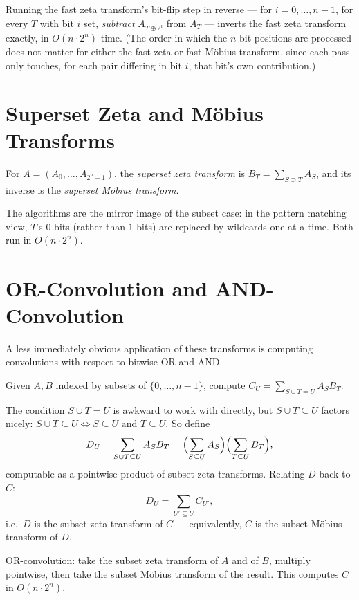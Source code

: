 \documentclass[11pt]{article}
\begin{document}
\begin{theorembox}
Running the fast zeta transform's bit-flip step in reverse --- for
$i=0,\ldots,n-1$, for every $T$ with bit $i$ set, \emph{subtract}
$A_{T\oplus 2^i}$ from $A_T$ --- inverts the fast zeta transform exactly,
in $O(n\cdot 2^n)$ time. (The order in which the $n$ bit positions are
processed does not matter for either the fast zeta or fast M\"obius
transform, since each pass only touches, for each pair differing in bit
$i$, that bit's own contribution.)
\end{theorembox}

\section{Superset Zeta and M\"obius Transforms}
\begin{definitionbox}
For $A=(A_0,\ldots,A_{2^n-1})$, the \emph{superset zeta transform} is
$B_T = \sum_{S \supseteq T}A_S$, and its inverse is the \emph{superset
M\"obius transform}.
\end{definitionbox}
The algorithms are the mirror image of the subset case: in the pattern
matching view, $T$'s $0$-bits (rather than $1$-bits) are replaced by
wildcards one at a time. Both run in $O(n\cdot 2^n)$.

\section{OR-Convolution and AND-Convolution}
A less immediately obvious application of these transforms is computing
convolutions with respect to bitwise OR and AND.

\begin{definitionbox}[OR-convolution]
Given $A,B$ indexed by subsets of $\{0,\ldots,n-1\}$, compute
$C_U = \sum_{S\cup T=U} A_SB_T$.
\end{definitionbox}
The condition $S\cup T=U$ is awkward to work with directly, but
$S\cup T\subseteq U$ factors nicely: $S\cup T\subseteq U \iff
S\subseteq U \text{ and } T\subseteq U$. So define
\[
  D_U = \sum_{S\cup T\subseteq U} A_SB_T
  = \Bigl(\sum_{S\subseteq U}A_S\Bigr)\Bigl(\sum_{T\subseteq U}B_T\Bigr),
\]
computable as a pointwise product of subset zeta transforms. Relating
$D$ back to $C$:
\[
  D_U = \sum_{U'\subseteq U} C_{U'},
\]
i.e.\ $D$ is the subset zeta transform of $C$ --- equivalently, $C$ is
the subset M\"obius transform of $D$.

\begin{theorembox}
OR-convolution: take the subset zeta transform of $A$ and of $B$,
multiply pointwise, then take the subset M\"obius transform of the
result. This computes $C$ in $O(n\cdot 2^n)$.
\end{theorembox}
\end{document}
